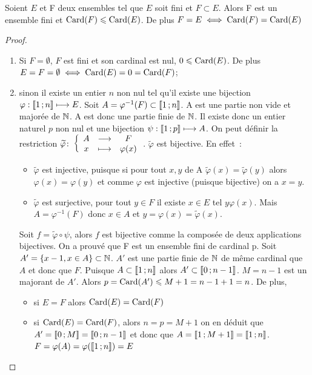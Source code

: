 \begin{theo}\label{theo:partiesfinies}
  Soient \(E\) et F deux ensembles tel que \(E\) soit fini et \(F\subset E\). Alors F est un ensemble fini et \(\operatorname{Card}(F)\leqslant\operatorname{Card}(E)\). De plus \(F=E \iff \operatorname{Card}(F)=\operatorname{Card}(E)\)
\end{theo}
\begin{proof}
  \begin{enumerate}
  \item Si \(F=\emptyset\), \(F\) est fini et son cardinal est nul, \(0\leqslant\operatorname{Card}(E)\). De plus \(E=F=\emptyset \iff \operatorname{Card}(E)=0=\operatorname{Card}(F)\);
  \item sinon il existe un entier \(n\) non nul tel qu'il existe une bijection \(\varphi:\mathopen{\llbracket}1\mathclose{}\mathpunct{};n\mathclose{\rrbracket} \longmapsto E\). Soit \(A=\varphi^{-1}(F) \subset\mathopen{\llbracket}1\mathclose{}\mathpunct{};n\mathclose{\rrbracket}\). A est une partie non vide et majorée de \(\mathbb{N}\). A est donc une partie finie de \(\mathbb{N}\). Il existe donc un entier naturel \(p\) non nul et une bijection \(\psi:\mathopen{\llbracket}1\mathclose{}\mathpunct{};p\mathclose{\rrbracket} \longmapsto A\). On peut définir la restriction \(\widetilde{\varphi}\colon \left\{\begin{array}{ccc} A & \longrightarrow &F\\ x & \longmapsto & \varphi(x) \end{array} \right.\). \(\widetilde{\varphi}\) est bijective. En effet~:
    \begin{itemize}
    \item \(\widetilde{\varphi}\) est injective, puisque si pour tout \(x,y\) de A \(\widetilde{\varphi}(x)=\widetilde{\varphi}(y)\) alors \(\varphi(x)=\varphi(y)\) et comme \(\varphi\) est injective (puisque bijective) on a \(x=y\).
    \item \(\widetilde{\varphi}\) est surjective, pour tout \(y\in F\) il existe \(x\in E\) tel \(y\varphi(x)\). Mais \(A=\varphi^{-1}(F)\) donc \(x\in A\) et \(y=\varphi(x)=\widetilde{\varphi}(x)\).
    \end{itemize}
    Soit \(f=\widetilde{\varphi}\circ \psi\), alors \(f\) est bijective comme la composée de deux applications bijectives. On a prouvé que F est un ensemble fini de cardinal p. Soit \(A'=\{x-1, x\in A\}\subset \mathbb{N}\). \(A'\) est une partie finie de \(\mathbb{N}\) de même cardinal que \(A\) et donc que \(F\). Puisque \(A\subset\mathopen{\llbracket}1\mathclose{}\mathpunct{};n\mathclose{\rrbracket}\) alors \(A'\subset\mathopen{\llbracket}0\mathclose{}\mathpunct{};n-1\mathclose{\rrbracket}\). \(M=n-1\) est un majorant de \(A'\). Alors \(p=\operatorname{Card}(A')\leqslant M+1=n-1+1=n\). De plus, 
    \begin{itemize}
    \item si \(E=F\) alors \(\operatorname{Card}(E)=\operatorname{Card}(F)\)
    \item si \(\operatorname{Card}(E)=\operatorname{Card}(F)\), alors \(n=p=M+1\) on en déduit que \(A'=\mathopen{\llbracket}0\mathclose{}\mathpunct{};M\mathclose{\rrbracket} = \mathopen{\llbracket}0\mathclose{}\mathpunct{};n-1\mathclose{\rrbracket}\) et donc que \(A=\mathopen{\llbracket}1\mathclose{}\mathpunct{};M+1\mathclose{\rrbracket} = \mathopen{\llbracket}1\mathclose{}\mathpunct{};n\mathclose{\rrbracket}\). \(F=\varphi(A)=\varphi(\mathopen{\llbracket}1\mathclose{}\mathpunct{};n\mathclose{\rrbracket})=E\)
    \end{itemize}
  \end{enumerate}
\end{proof}

